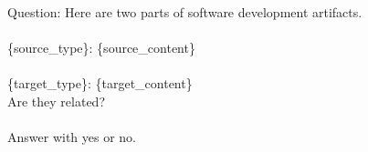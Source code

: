 Question: Here are two parts of software development artifacts.\\
\\
\{source\_type\}: \tripplequote \{source\_content\}\tripplequote\\
\\
\{target\_type\}: \tripplequote\{target\_content\}\tripplequote\\
Are they related?\\
\\
Answer with \textquotesingle{}yes\textquotesingle{} or  \textquotesingle{}no\textquotesingle{}.